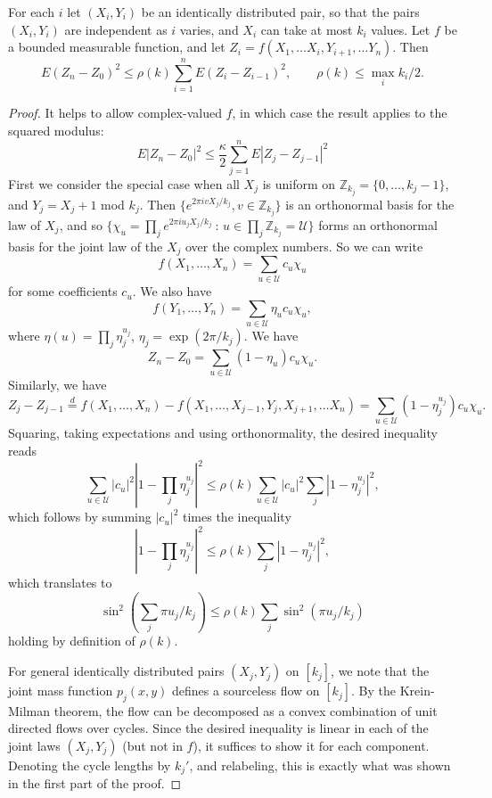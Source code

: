 \documentclass[10pt,a4paper]{amsart}
\begin{document}
\begin{theorem}\label{thm: finite support}
For each \(i\) let \((X_i,Y_i)\) be an identically distributed pair, so that the pairs \((X_i,Y_i)\) are independent as \(i\) varies, and \(X_i\) can take at most \(k_i\) values. Let \(f\) be a bounded measurable function, and let \(Z_i=f(X_1,\ldots X_{i},Y_{i+1},\ldots Y_n)\). Then
$$
E(Z_n-Z_0)^2\le \rho(k) \sum_{i=1}^n E(Z_i-Z_{i-1})^2, \qquad \rho (k)\le \max_i k_i/2.
$$
\end{theorem}

\begin{proof}
It helps to allow complex-valued \(f\), in which case the result applies to the squared modulus:
$$
E|Z_n-Z_0|^2\le \frac{\kappa}{2}\sum_{j=1}^n E|Z_j-Z_{j-1}|^2
$$
First we consider the special case when all \(X_j\) is uniform on \(\mathbb Z_{k_j}=\{0,\ldots,k_j-1\}\), and \(Y_j=X_{j}+1\) mod \(k_j\). Then \(\{e^{2\pi i v X_j/k_j}, v\in \mathbb Z_{k_j}\}\) is an orthonormal basis for the law of \(X_j\), and so
\(\{\chi_u=\prod_j e^{2\pi iu_j X_j/k_j}\ :\,u\in \prod_j \mathbb Z_{k_j}=\mathcal U\}\) forms an orthonormal basis for the joint law of the \(X_j\) over the complex numbers. So we can write
$$f(X_1,\ldots, X_n)=\sum_{u\in \mathcal U}c_u\chi_u$$ for some coefficients \(c_u\). We also have
$$f(Y_1,\ldots, Y_n)=\sum_{u\in \mathcal U}\eta_uc_u\chi_u,$$
where \(\eta(u)=\prod_j \eta_j^{u_j}\), \(\eta_j=\exp(2\pi/k_j)\). We have
$$
Z_n-Z_0=\sum_{u\in \mathcal U} (1-\eta_u)c_u\chi_u.
$$
Similarly, we have
$$
Z_{j}-Z_{j-1}\stackrel{d}{=}f(X_1,\ldots,X_n)-f(X_1,\ldots,X_{j-1}, Y_{j},X_{j+1},\ldots X_n)=\sum_{u\in \mathcal U}(1-\eta_j^{u_j})c_u\chi_u.
$$
Squaring, taking expectations and using orthonormality, the desired inequality reads
$$
\sum _{u\in \mathcal U}|c_u|^2|1-\prod_j\eta_j^{u_j}|^2\le \rho(k)\sum _{u\in \mathcal U}|c_u|^2\sum_j|1-\eta_j^{u_j}|^2,
$$
which follows by summing \(|c_u|^2\) times the inequality
$$
|1-\prod_j\eta_j^{u_j}|^2\le \rho(k)\sum_j|1-\eta_j^{u_j}|^2,
$$
which translates to
$$
\sin^2(\sum_{j} \pi u_j/k_j)\le \rho(k)\sum_{j}\sin^2(\pi u_j/k_j)
$$
holding by definition of \(\rho(k)\).

For general identically distributed pairs \((X_j,Y_j)\) on \([k_j]\), we note that the joint mass function \(p_j(x,y)\) defines a sourceless flow on \([k_j]\). By the Krein-Milman theorem, the flow can be decomposed as a convex combination of unit directed flows over cycles. Since the desired inequality is linear in each of the joint laws \((X_j,Y_j)\) (but not in \(f\)), it suffices to show it for each component. Denoting the cycle lengths by \(k_j'\), and relabeling, this is exactly what was shown in the first part of the proof.
\end{proof}
\end{document}
